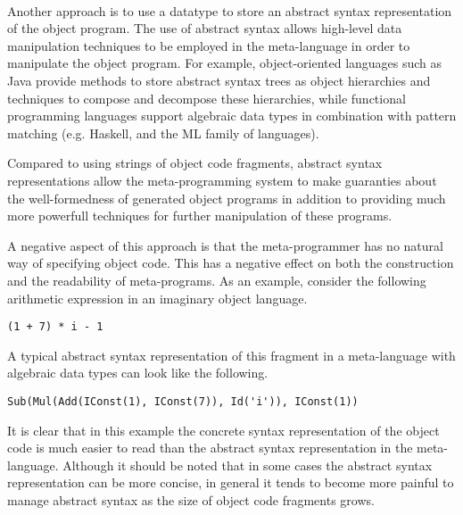 \documentclass[a4paper,11pt]{article}
\begin{document}
\paragraph{}

Another approach is to use a datatype to store an abstract syntax representation
of the object program. The use of abstract syntax allows high-level data
manipulation techniques to be employed in the meta-language in order to
manipulate the object program. For example, object-oriented languages such
as Java provide methods to store abstract syntax trees as object hierarchies
and techniques to compose and decompose these hierarchies, while functional
programming languages support algebraic data types in combination with pattern
matching (e.g. Haskell, and the ML family of languages).

Compared to using strings of object code fragments, abstract syntax
representations allow the meta-programming system to make guaranties about the
well-formedness of generated object programs in addition to providing much more
powerfull techniques for further manipulation of these programs.

A negative aspect of this approach is that the meta-programmer has no natural
way of specifying object code. This has a negative effect on both the
construction and the readability of meta-programs. As an example, consider the
following arithmetic expression in an imaginary object language.
\begin{lstlisting}[title=Example expression in concrete syntax]
(1 + 7) * i - 1
\end{lstlisting}
A typical abstract syntax representation of this fragment in a meta-language
with algebraic data types can look like the following.
\begin{lstlisting}[title=Example expression in abstract syntax]
Sub(Mul(Add(IConst(1), IConst(7)), Id('i')), IConst(1))
\end{lstlisting}
It is clear that in this example the concrete syntax representation of the
object code is much easier to read than the abstract syntax representation in
the meta-language. Although it should be noted that in some cases the abstract
syntax representation can be more concise, in general it tends to become more
painful to manage abstract syntax as the size of object code fragments grows.

\paragraph{}
\end{document}
